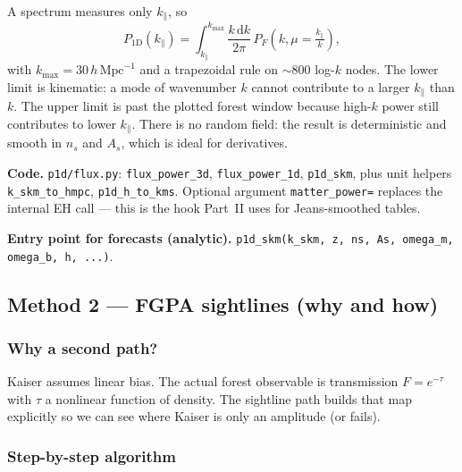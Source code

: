 \documentclass[11pt]{article}
\begin{document}
A spectrum measures only $k_\parallel$, so
\begin{equation}
P_{1\mathrm{D}}(k_\parallel)
=
\int_{k_\parallel}^{k_\mathrm{max}}
\frac{k\,\mathrm{d}k}{2\pi}\,
P_F\!\left(k,\mu=\tfrac{k_\parallel}{k}\right),
\end{equation}
with $k_\mathrm{max}=30\,h\,\mathrm{Mpc}^{-1}$ and a trapezoidal rule on $\sim 800$ log-$k$ nodes.
The lower limit is kinematic: a mode of wavenumber $k$ cannot contribute to a larger $k_\parallel$ than $k$.
The upper limit is past the plotted forest window because high-$k$ power still contributes to lower $k_\parallel$.
There is no random field: the result is deterministic and smooth in $n_s$ and $A_s$, which is ideal for derivatives.

\textbf{Code.}
\texttt{p1d/flux.py}:
\texttt{flux\_power\_3d}, \texttt{flux\_power\_1d}, \texttt{p1d\_skm},
plus unit helpers \texttt{k\_skm\_to\_hmpc}, \texttt{p1d\_h\_to\_kms}.
Optional argument \texttt{matter\_power=} replaces the internal EH call --- this is the hook Part~II uses for Jeans-smoothed tables.

\textbf{Entry point for forecasts (analytic).}
\texttt{p1d\_skm(k\_skm, z, ns, As, omega\_m, omega\_b, h, ...)}.

\subsection{Method 2 --- FGPA sightlines (why and how)}

\subsubsection{Why a second path?}

Kaiser assumes linear bias.
The actual forest observable is transmission $F=e^{-\tau}$ with $\tau$ a nonlinear function of density.
The sightline path builds that map explicitly so we can see where Kaiser is only an amplitude (or fails).

\subsubsection{Step-by-step algorithm}
\end{document}
